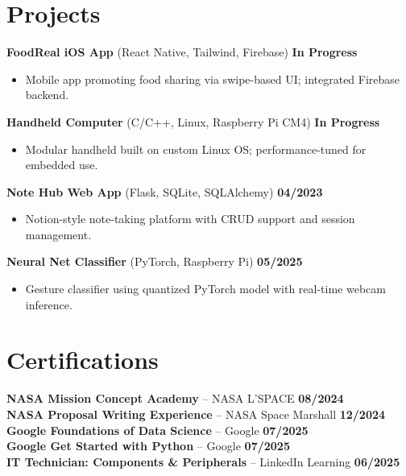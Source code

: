 \documentclass[letterpaper,11pt]{article}
\begin{document}
\section*{Projects}
\textbf{FoodReal iOS App} (React Native, Tailwind, Firebase) \hfill \textbf{In Progress}
\begin{itemize}
    \item Mobile app promoting food sharing via swipe-based UI; integrated Firebase backend.
\end{itemize}
\textbf{Handheld Computer} (C/C++, Linux, Raspberry Pi CM4) \hfill \textbf{In Progress}
\begin{itemize}
    \item Modular handheld built on custom Linux OS; performance-tuned for embedded use.
\end{itemize}
\textbf{Note Hub Web App} (Flask, SQLite, SQLAlchemy) \hfill \textbf{04/2023}
\begin{itemize}
    \item Notion-style note-taking platform with CRUD support and session management.
\end{itemize}
\textbf{Neural Net Classifier} (PyTorch, Raspberry Pi) \hfill \textbf{05/2025}
\begin{itemize}
    \item Gesture classifier using quantized PyTorch model with real-time webcam inference.
\end{itemize}

\section*{Certifications}
\textbf{NASA Mission Concept Academy} – NASA L’SPACE \hfill \textbf{08/2024} \\
\textbf{NASA Proposal Writing Experience} – NASA Space Marshall \hfill \textbf{12/2024} \\
\textbf{Google Foundations of Data Science} – Google \hfill \textbf{07/2025} \\
\textbf{Google Get Started with Python} – Google \hfill \textbf{07/2025} \\
\textbf{IT Technician: Components \& Peripherals} – LinkedIn Learning \hfill \textbf{06/2025} \\
\end{document}
